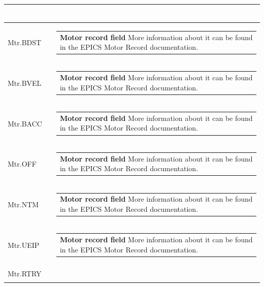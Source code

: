 \documentclass[openany]{article}
\begin{document}
\begin{longtable}{| m{4.5cm} m{2.5cm}  m{8.5cm} |}
\begin{tabular}{@{}m{6cm}@{}}
            \end{tabular} \hypertarget{pv:mtr-bdst}{}\\ \hline
        Mtr.BDST &  & \begin{tabular}{@{}m{6cm}@{}}
                \textbf{\color{ForestGreen} Motor record field} More information about it can be found in the EPICS Motor Record documentation.
            \end{tabular} \hypertarget{pv:mtr-bvel}{}\\ \hline
        Mtr.BVEL &  & \begin{tabular}{@{}m{6cm}@{}}
                \textbf{\color{ForestGreen} Motor record field} More information about it can be found in the EPICS Motor Record documentation.
            \end{tabular} \hypertarget{pv:mtr-bacc}{}\\ \hline
        Mtr.BACC &  & \begin{tabular}{@{}m{6cm}@{}}
                \textbf{\color{ForestGreen} Motor record field} More information about it can be found in the EPICS Motor Record documentation.
            \end{tabular} \hypertarget{pv:mtr-off}{}\\ \hline
        Mtr.OFF &  & \begin{tabular}{@{}m{6cm}@{}}
                \textbf{\color{ForestGreen} Motor record field} More information about it can be found in the EPICS Motor Record documentation.
            \end{tabular} \hypertarget{pv:mtr-ntm}{}\\ \hline
        Mtr.NTM &  & \begin{tabular}{@{}m{6cm}@{}}
                \textbf{\color{ForestGreen} Motor record field} More information about it can be found in the EPICS Motor Record documentation.
            \end{tabular} \hypertarget{pv:mtr-ueip}{}\\ \hline
        Mtr.UEIP &  & \begin{tabular}{@{}m{6cm}@{}}
                \textbf{\color{ForestGreen} Motor record field} More information about it can be found in the EPICS Motor Record documentation.
            \end{tabular} \hypertarget{pv:mtr-rtry}{}\\ \hline
        Mtr.RTRY &  & \begin{tabular}{@{}m{6cm}@{}}

\end{tabular}
\end{longtable}
\end{document}
